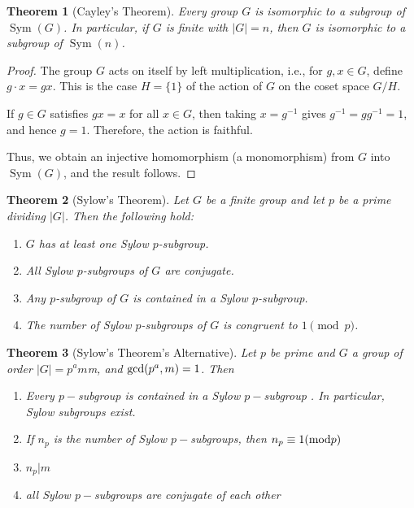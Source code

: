 \documentclass[titlepage]{article}
\theoremstyle{plain}
\newtheorem{theorem}{Theorem}[section]
\theoremstyle{definition}
\theoremstyle{remark}
\theoremstyle{exercise-style}
\numberwithin{equation}{section}
\numberwithin{theorem}{section}
\numberwithin{remark}{section}
\begin{document}
\begin{myboxg}
    \begin{theorem}[Cayley's Theorem]
        Every group $G$ is isomorphic to a subgroup of $\operatorname{Sym}(G)$. 
        In particular, if $G$ is finite with $|G| = n$, then $G$ is isomorphic 
        to a subgroup of $\operatorname{Sym}(n)$.
    \end{theorem}
\end{myboxg}

\begin{proof}
    The group $G$ acts on itself by left multiplication, i.e., for $g,x \in G$,
    define $g \cdot x = gx$. This is the case $H = \{1\}$ of the action of $G$ 
    on the coset space $G/H$.
    
    If $g \in G$ satisfies $gx = x$ for all $x \in G$, then taking $x = g^{-1}$ 
    gives $g^{-1} = gg^{-1} = 1$, and hence $g = 1$. Therefore, the action is 
    faithful.
    
    Thus, we obtain an injective homomorphism (a monomorphism) from $G$ into 
    $\operatorname{Sym}(G)$, and the result follows.
\end{proof}

\begin{myboxg}
    \begin{theorem}[Sylow's Theorem]
        Let $G$ be a finite group and let $p$ be a prime dividing $|G|$. Then the following hold:
        \begin{enumerate}
            \item $G$ has at least one Sylow $p$-subgroup.
            \item All Sylow $p$-subgroups of $G$ are conjugate.
            \item Any $p$-subgroup of $G$ is contained in a Sylow $p$-subgroup.
            \item The number of Sylow $p$-subgroups of $G$ is congruent to $1 \pmod{p}$.
        \end{enumerate}
    \end{theorem}
\end{myboxg}

\begin{myboxg}
    \begin{theorem}[Sylow's Theorem's Alternative]
        Let $p$ be prime and $G$ a group of order $|G|= p^am$m, and $\textnormal{gcd}(p^a,m)=1$. Then
        \begin{enumerate}[(1)]
            \item Every $p-$subgroup is contained in a Sylow $p-$subgroup . In particular, Sylow subgroups exist.
            \item If $n_p$ is the number of Sylow $p-$subgroups, then $n_p \equiv 1 (\textnormal{mod}p)$
            \item $n_p|m$ 
            \item all Sylow $p-$subgroups are conjugate of each other
        \end{enumerate}
    \end{theorem}
\end{myboxg}
\end{document}
